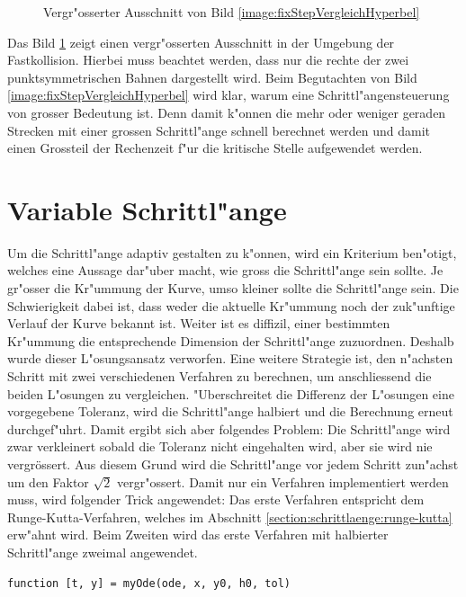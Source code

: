 \begin{refsection}
\begin{figure}
\caption{Vergr"osserter Ausschnitt von Bild \ref{image:fixStepVergleichHyperbel}}
\label{image:fixStepVergleichHyperbelZoom}
\end{figure}
Das Bild \ref{image:fixStepVergleichHyperbelZoom} zeigt einen vergr"osserten Ausschnitt in der Umgebung der Fastkollision.
Hierbei muss beachtet werden, dass nur die rechte der zwei punktsymmetrischen Bahnen dargestellt wird.
Beim Begutachten von Bild \ref{image:fixStepVergleichHyperbel} wird klar, warum eine Schrittl"angensteuerung von grosser Bedeutung ist.
Denn damit k"onnen die mehr oder weniger geraden Strecken mit einer grossen Schrittl"ange schnell berechnet werden und damit einen Grossteil der Rechenzeit f"ur die kritische Stelle aufgewendet werden.

\section{Variable Schrittl"ange}

Um die Schrittl"ange adaptiv gestalten zu k"onnen, wird ein Kriterium ben"otigt, welches eine Aussage dar"uber macht, wie gross die Schrittl"ange sein sollte.
Je gr"osser die Kr"ummung der Kurve, umso kleiner sollte die Schrittl"ange sein.
Die Schwierigkeit dabei ist, dass weder die aktuelle Kr"ummung noch der zuk"unftige Verlauf der Kurve bekannt ist.
Weiter ist es diffizil, einer bestimmten Kr"ummung die entsprechende Dimension der Schrittl"ange zuzuordnen.
Deshalb wurde dieser L"osungsansatz verworfen.
Eine weitere Strategie ist, den n"achsten Schritt mit zwei verschiedenen Verfahren zu berechnen, um anschliessend die beiden L"osungen zu vergleichen.
"Uberschreitet die Differenz der L"osungen eine vorgegebene Toleranz, wird die Schrittl"ange halbiert und die Berechnung erneut durchgef"uhrt.
Damit ergibt sich aber folgendes Problem: Die Schrittl"ange wird zwar verkleinert sobald die Toleranz nicht eingehalten wird, aber sie wird nie vergrössert.
Aus diesem Grund wird die Schrittl"ange vor jedem Schritt zun"achst um den Faktor $\sqrt{2}$ vergr"ossert. 
Damit nur ein Verfahren implementiert werden muss, wird folgender Trick angewendet: 
Das erste Verfahren entspricht dem Runge-Kutta-Verfahren, welches im Abschnitt \ref{section:schrittlaenge:runge-kutta} erw"ahnt wird.
Beim Zweiten wird das erste Verfahren mit halbierter Schrittl"ange zweimal angewendet. 
\begin{lstlisting}[style=Matlab, caption=Variable Schrittl"ange, captionpos=b, label=code:myOde] 
function [t, y] = myOde(ode, x, y0, h0, tol)
    

\end{lstlisting}
\end{refsection}
